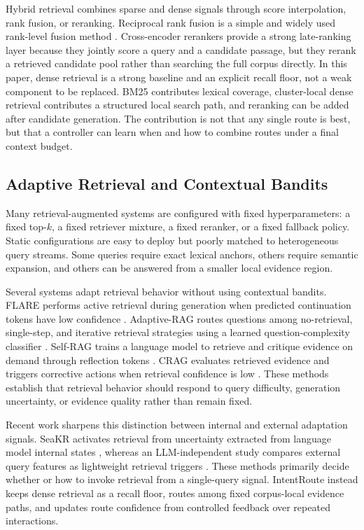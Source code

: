 Hybrid retrieval combines sparse and dense signals through score interpolation, rank fusion, or reranking. Reciprocal rank fusion is a simple and widely used rank-level fusion method \citep{cormack2009rrf}. Cross-encoder rerankers provide a strong late-ranking layer because they jointly score a query and a candidate passage, but they rerank a retrieved candidate pool rather than searching the full corpus directly. In this paper, dense retrieval is a strong baseline and an explicit recall floor, not a weak component to be replaced. BM25 contributes lexical coverage, cluster-local dense retrieval contributes a structured local search path, and reranking can be added after candidate generation. The contribution is not that any single route is best, but that a controller can learn when and how to combine routes under a final context budget.

\subsection{Adaptive Retrieval and Contextual Bandits}
\label{sec:03-related-work:adaptive-retrieval-and-contextual-bandits}

Many retrieval-augmented systems are configured with fixed hyperparameters: a fixed top-$k$, a fixed retriever mixture, a fixed reranker, or a fixed fallback policy. Static configurations are easy to deploy but poorly matched to heterogeneous query streams. Some queries require exact lexical anchors, others require semantic expansion, and others can be answered from a smaller local evidence region.

Several systems adapt retrieval behavior without using contextual bandits. FLARE performs active retrieval during generation when predicted continuation tokens have low confidence \citep{jiang2023flare}. Adaptive-RAG routes questions among no-retrieval, single-step, and iterative retrieval strategies using a learned question-complexity classifier \citep{jeong2024adaptiverag}. Self-RAG trains a language model to retrieve and critique evidence on demand through reflection tokens \citep{asai2024selfrag}. CRAG evaluates retrieved evidence and triggers corrective actions when retrieval confidence is low \citep{yan2024crag}. These methods establish that retrieval behavior should respond to query difficulty, generation uncertainty, or evidence quality rather than remain fixed.

Recent work sharpens this distinction between internal and external adaptation signals. SeaKR activates retrieval from uncertainty extracted from language model internal states \citep{yao2025seakr}, whereas an LLM-independent study compares external query features as lightweight retrieval triggers \citep{marina2025llm}. These methods primarily decide whether or how to invoke retrieval from a single-query signal. IntentRoute instead keeps dense retrieval as a recall floor, routes among fixed corpus-local evidence paths, and updates route confidence from controlled feedback over repeated interactions.


